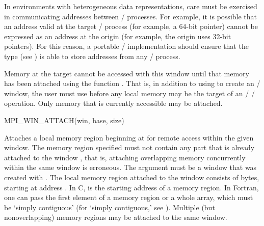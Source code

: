 \begin{implementors}
In environments with heterogeneous data representations, care must be
exercised in communicating addresses between \mpi/ processes.  For example, it
is possible that an address valid at the target \mpi/ process (for example, a
64-bit pointer) cannot be expressed as an address at the origin (for
example, the origin uses 32-bit pointers).  For this reason, a portable
\MPI/ implementation should ensure that the type 
(see ) is able to store addresses
from any \mpi/ process.
\end{implementors}

Memory at the target cannot be accessed with this window until that memory
has been
attached using the function .
That is, in addition to using  to
create an \MPI/ window, the user must use 
before any local memory may be the target of an \MPI/ \RMA/ operation.
Only memory that is currently accessible may be attached.  

\begin{funcdef}{MPI\_WIN\_ATTACH}{(\mbox{win}, \mbox{base}, \mbox{size})}
\end{funcdef}

Attaches a local memory region beginning at
 for remote access within the given window. The memory region
specified must not contain any part that is already attached to the
window ,
that is, attaching overlapping memory concurrently within the same window is
erroneous. The argument  must be a window that was created with
.
The local memory region attached to the window consists of  bytes,
starting at address .
In C,  is the starting address of a
memory region. In Fortran, one can pass the first element of a memory
region or a whole array, which must be `simply contiguous' (for
`simply contiguous,' see ).
Multiple (but nonoverlapping) memory
regions may be attached to the same window.

